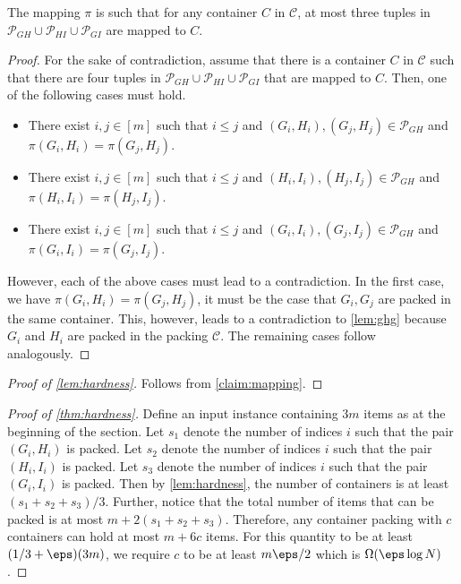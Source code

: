 \begin{claim}
\label{claim:mapping}
    The mapping $\pi$ is such that for any container $C$ in $\mathcal C$, at most three tuples in $\mathcal P_{GH}\cup \mathcal P_{HI}\cup \mathcal P_{GI}$ are mapped to $C$.
\end{claim}
\begin{proof}
    For the sake of contradiction, assume that there is a container $C$ in $\mathcal C$ such that there are four tuples in $\mathcal P_{GH}\cup \mathcal P_{HI}\cup \mathcal P_{GI}$ that are mapped to $C$.
    Then, one of the following cases must hold.
    \begin{itemize}
        \item There exist $i,j\in[m]$ such that $i\le j$ and $(G_i,H_i),(G_j,H_j)\in \mathcal P_{GH}$ and $\pi(G_i,H_i)=\pi(G_j,H_j)$.
        \item There exist $i,j\in[m]$ such that $i\le j$ and $(H_i,I_i),(H_j,I_j)\in \mathcal P_{GH}$ and $\pi(H_i,I_i)=\pi(H_j,I_j)$.
        \item There exist $i,j\in[m]$ such that $i\le j$ and $(G_i,I_i),(G_j,I_j)\in \mathcal P_{GH}$ and $\pi(G_i,I_i)=\pi(G_j,I_j)$.
    \end{itemize}
    However, each of the above cases must lead to a contradiction. 
    In the first case, we have $\pi(G_i,H_i)=\pi(G_j,H_j)$, it must be the case that $G_i,G_j$ are packed in the same container.
    This, however, leads to a contradiction to \cref{lem:ghg} because $G_i$ and $H_i$ are packed in the packing $\mathcal C$. The remaining cases follow analogously.
\end{proof}
\begin{proof}[Proof of \cref{lem:hardness}]
    Follows from \cref{claim:mapping}.
\end{proof}
\begin{proof}[Proof of \cref{thm:hardness}]
    Define an input instance containing $3m$ items as at the beginning of the section. 
    Let $s_1$ denote the number of indices $i$ such that the pair $(G_i,H_i)$ is packed.
    Let $s_2$ denote the number of indices $i$ such that the pair $(H_i,I_i)$ is packed.
    Let $s_3$ denote the number of indices $i$ such that the pair $(G_i,I_i)$ is packed.
    Then by \cref{lem:hardness}, the number of containers is at least $(s_1+s_2+s_3)/3$. Further, notice that
    the total number of items that can be packed is at most $m+2(s_1+s_2+s_3)$. Therefore, any container packing with $c$ containers can hold at most $m+6c$ items. For this quantity to be at least
    $(1/3+\eps)(3m)$, we require $c$ to be at least $m\eps/2$ which is $\Omega(\eps\log N)$.
\end{proof}
    
